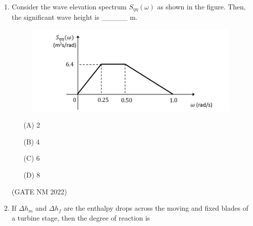 \documentclass[journal,12pt,onecolumn]{IEEEtran}
\theoremstyle{remark}
\begin{document}
\begin{enumerate}
\begin{multicols}{2}

\begin{enumerate}
    \item[(A)] 1.080 and 0.648
    \item[(B)] 0.608 and 0.556
    \item[(C)] 0.926 and 0.648
    \item[(D)] 0.926 and 0.556
\end{enumerate}

\end{multicols}

\hfill(GATE NM 2022)









\item  Consider the wave elevation spectrum $S_{\eta\eta}(\omega)$ as shown in the figure.  
Then, the significant wave height is \_\_\_\_\_ m.

\begin{figure}[h]
    \centering
	\includegraphics[width=0.3\columnwidth]{fig5}
	\caption{}
	\label{fig:placeholder}
\end{figure}

\begin{multicols}{4}

\begin{enumerate}
    \item[(A)] 2
    \item[(B)] 4
    \item[(C)] 6
    \item[(D)] 8
\end{enumerate}

\end{multicols}

\hfill(GATE NM 2022)











\item  If $\Delta h_m$ and $\Delta h_f$ are the enthalpy drops across the moving and fixed blades of a turbine stage, then the degree of reaction is


\end{enumerate}
\end{document}
